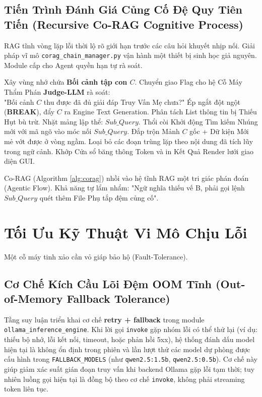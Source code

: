 \documentclass[10pt, conference, a4paper, compsocconf]{IEEEtran}
\begin{document}
\subsection{Tiến Trình Đánh Giá Củng Cố Đệ Quy Tiên Tiến (Recursive Co-RAG Cognitive Process)}

RAG tĩnh vòng lặp lỗi thời lộ rõ giới hạn trước các câu hỏi khuyết nhịp nối. Giải pháp vĩ mô \texttt{corag\_chain\_manager.py} vận hành một thiết bị sinh học giả nguyên. Module cấp cho Agent quyền hạn tự rà soát.

\begin{algorithm}[!htb]
\caption{Phân Tích Logic Vòng lặp Đệ quy Co-RAG Assessment Agent}
\begin{algorithmic}[1]
\STATE Xây vùng nhớ chứa \textbf{Bối cảnh tập con $C$}.
\STATE Chuyển giao Flag cho hệ Cỗ Máy Thẩm Phán \textbf{Judge-LLM} rà soát: \\ "Bối cảnh $C$ thu được đã đủ giải đáp Truy Vấn Mẹ chưa?"
\STATE Ép ngắt đột ngột (\textbf{BREAK}), đẩy $C$ ra Engine Text Generation.
\ELSE
\STATE Phân tách List thông tin bị Thiếu Hụt bù trừ.
\STATE Nhặt mảng lập thể: $Sub\_Query$.
\STATE Thổi còi Khởi động Tìm kiếm Nhúng mới với mã ngõ vào móc nối $Sub\_Query$. 
\STATE Đắp trộn Mảnh $C$ gốc + Dữ kiện Mới mẻ vớt được ở vòng ngầm.
\STATE Loại bỏ các đoạn trùng lặp theo nội dung đã tích lũy trong ngữ cảnh.
\ENDIF
\ENDFOR
\STATE Khớp Cửa sổ băng thông Token và in Kết Quả Render lưới giao diện GUI.
\end{algorithmic}
\label{alg:corag}
\end{algorithm}

Co-RAG (Algorithm \ref{alg:corag}) nhồi vào hệ tĩnh RAG một tri giác phán đoán (Agentic Flow). Khả năng tự lẩm nhẩm: "Ngữ nghĩa thiếu vế B, phải gọi lệnh $Sub\_Query$ quét thêm File Phụ tắp đệm củng cố". 

\section{Tối Ưu Kỹ Thuật Vi Mô Chịu Lỗi}

Một cỗ máy tinh xảo cần vỏ giáp bảo hộ (Fault-Tolerance). 

\subsection{Cơ Chế Kích Cầu Lõi Đệm OOM Tĩnh (Out-of-Memory Fallback Tolerance)}
Tầng suy luận triển khai cơ chế \textbf{retry + fallback} trong module \texttt{ollama\_inference\_engine}. Khi lời gọi \texttt{invoke} gặp nhóm lỗi có thể thử lại (ví dụ: thiếu bộ nhớ, lỗi kết nối, timeout, hoặc phản hồi 5xx), hệ thống đánh dấu model hiện tại là không ổn định trong phiên và lần lượt thử các model dự phòng được cấu hình trong \texttt{FALLBACK\_MODELS} (như \texttt{qwen2.5:1.5b}, \texttt{qwen2.5:0.5b}). Cơ chế này giúp giảm xác suất gián đoạn truy vấn khi backend Ollama gặp lỗi tạm thời; tuy nhiên luồng gọi hiện tại là đồng bộ theo cơ chế \texttt{invoke}, không phải streaming token liên tục.
\end{document}
